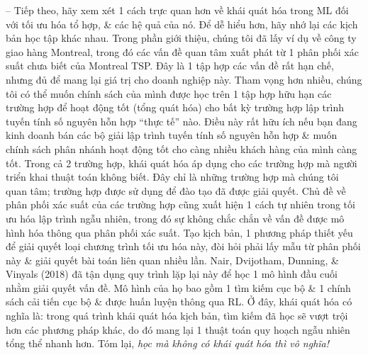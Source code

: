 \documentclass{article}
\begin{document}
\begin{itemize}
\begin{itemize}
        -- Tiếp theo, hãy xem xét 1 cách trực quan hơn về khái quát hóa trong ML đối với tối ưu hóa tổ hợp, \& các hệ quả của nó. Để dễ hiểu hơn, hãy nhớ lại các kịch bản học tập khác nhau. Trong phần giới thiệu, chúng tôi đã lấy ví dụ về công ty giao hàng Montreal, trong đó các vấn đề quan tâm xuất phát từ 1 phân phối xác suất chưa biết của Montreal TSP. Đây là 1 tập hợp các vấn đề rất hạn chế, nhưng đủ để mang lại giá trị cho doanh nghiệp này. Tham vọng hơn nhiều, chúng tôi có thể muốn chính sách của mình được học trên 1 tập hợp hữu hạn các trường hợp để hoạt động tốt (tổng quát hóa) cho bất kỳ trường hợp lập trình tuyến tính số nguyên hỗn hợp ``thực tế'' nào. Điều này rất hữu ích nếu bạn đang kinh doanh bán các bộ giải lập trình tuyến tính số nguyên hỗn hợp \& muốn chính sách phân nhánh hoạt động tốt cho càng nhiều khách hàng của mình càng tốt. Trong cả 2 trường hợp, khái quát hóa áp dụng cho các trường hợp mà người triển khai thuật toán không biết. Đây chỉ là những trường hợp mà chúng tôi quan tâm; trường hợp được sử dụng để đào tạo đã được giải quyết. Chủ đề về phân phối xác suất của các trường hợp cũng xuất hiện 1 cách tự nhiên trong tối ưu hóa lập trình ngẫu nhiên, trong đó sự không chắc chắn về vấn đề được mô hình hóa thông qua phân phối xác suất. Tạo kịch bản, 1 phương pháp thiết yếu để giải quyết loại chương trình tối ưu hóa này, đòi hỏi phải lấy mẫu từ phân phối này \& giải quyết bài toán liên quan nhiều lần. Nair, Dvijotham, Dunning, \& Vinyals (2018) đã tận dụng quy trình lặp lại này để học 1 mô hình đầu cuối nhằm giải quyết vấn đề. Mô hình của họ bao gồm 1 tìm kiếm cục bộ \& 1 chính sách cải tiến cục bộ \& được huấn luyện thông qua RL. Ở đây, khái quát hóa có nghĩa là: trong quá trình khái quát hóa kịch bản, tìm kiếm đã học sẽ vượt trội hơn các phương pháp khác, do đó mang lại 1 thuật toán quy hoạch ngẫu nhiên tổng thể nhanh hơn. Tóm lại, {\it học mà không có khái quát hóa thì vô nghĩa!}


\end{itemize}
\end{itemize}
\end{document}

